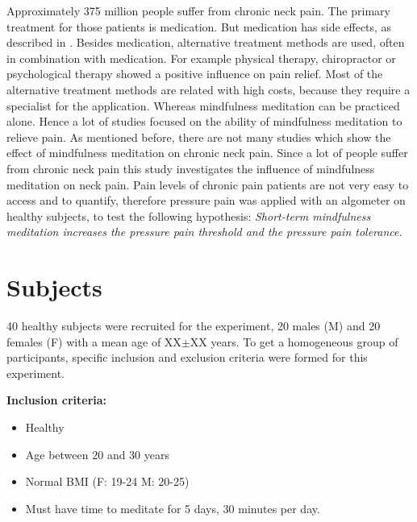 Approximately 375 million people suffer from chronic neck pain. The primary treatment for those patients is medication. But medication has side effects, as described in .  Besides medication, alternative treatment methods are used, often in combination with medication. For example physical therapy, chiropractor or psychological therapy showed a positive influence on pain relief. Most of the alternative treatment methods are related with high costs, because they require a specialist for the application. Whereas mindfulness meditation can be  practiced alone. Hence a lot of studies focused on the ability of mindfulness meditation to relieve pain.
As mentioned before, there are not many studies which show the effect of mindfulness meditation on chronic neck pain. Since a lot of people suffer from chronic neck pain this study investigates the influence of mindfulness meditation on neck pain. Pain levels of chronic pain patients are not very easy to access and to quantify, therefore pressure pain was applied with an algometer on healthy subjects, to test the following hypothesis:
\textit{Short-term mindfulness meditation increases the pressure pain threshold and the pressure pain tolerance.}


\section{Subjects}
40 healthy subjects were recruited for the experiment, 20 males (M) and 20 females
(F) with a mean age of XX$\pm$XX years. To get a homogeneous group of participants, specific inclusion and exclusion criteria were  formed for this experiment.

\textbf{Inclusion criteria:}
\vspace{-.5cm}
\begin{itemize}
	\item Healthy
	\vspace{-.3cm}
	\item Age between 20 and 30 years
	\vspace{-.3cm}
	\item Normal BMI (F: 19-24 M: 20-25)
	\vspace{-.3cm}
	\item Must have time to meditate for 5 days, 30 minutes per day.
\end{itemize}

